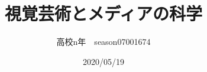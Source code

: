 \documentclass{jsarticle}
\begin{document}
\title{視覚芸術とメディアの科学}
\author{高校n年　season07001674}
\date{2020/05/19}
\maketitle
\newcommand{\repart}[1]{\part{#1}\setcounter{section}{0}}
\newcommand{\lr}[1]{\left(#1 \right)}
\newcommand{\mlr}[1]{\left\{#1 \right\}}
\newcommand{\llr}[1]{\left[#1 \right]}
\newcommand{\rec}[1]{\frac{1}{#1}}
\newcommand{\de}[2][]{\frac{d #1}{d #2}}
\newcommand{\dd}[2][]{\frac{d^2 #1}{d #2^2}}
\newcommand{\pd}[2][]{\frac{\partial #1}{\partial #2}}
\newcommand{\ppd}[3]{\frac{\partial^2 #1}{\partial #2\partial #3}}
\newcommand{\pmat}[1]{\begin{pmatrix} #1 \end{pmatrix}}
\newcommand{\co}[1][]{\cos^{#1}\theta}
\newcommand{\si}[1][]{\sin^{#1}\theta}
\newcommand{\grad}{\mathrm{grad}}
\newcommand{\dive}{\mathrm{div}}
\newcommand{\rot}{\mathrm{rot}}
\newcommand{\pa}{\partial}
\newcommand{\na}{\nabla}

\end{document}
